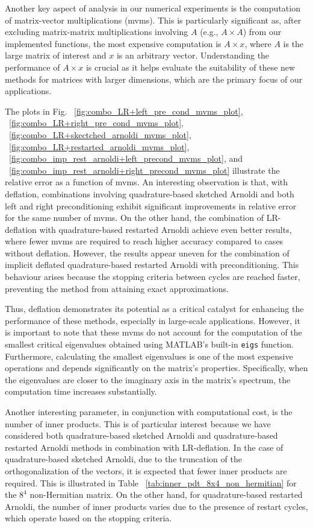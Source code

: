 Another key aspect of analysis in our numerical experiments is the computation of matrix-vector multiplications (mvms). This is particularly significant as, after excluding matrix-matrix multiplications involving $A$ (e.g., $A \times A$) from our implemented functions, the most expensive computation is $A \times x$, where $A$ is the large matrix of interest and $x$ is an arbitrary vector. Understanding the performance of $A \times x$ is crucial as it helps evaluate the suitability of these new methods for matrices with larger dimensions, which are the primary focus of our applications.

The plots in Fig. ~\ref{fig:combo_LR+left_pre_cond_mvms_plot},
~\ref{fig:combo_LR+right_pre_cond_mvms_plot}, ~\ref{fig:combo_LR+skectched_arnoldi_mvms_plot}, ~\ref{fig:combo_LR+restarted_arnoldi_mvms_plot},
~\ref{fig:combo_imp_rest_arnoldi+left_precond_mvms_plot}, and ~\ref{fig:combo_imp_rest_arnoldi+right_precond_mvms_plot}  illustrate the relative error as a function of mvms. An interesting observation is that, with deflation, combinations involving quadrature-based sketched Arnoldi and both left and right preconditioning exhibit significant improvements in relative error for the same number of mvms. On the other hand, the combination of LR-deflation with quadrature-based restarted Arnoldi achieve even better results, where fewer mvms are required to reach higher accuracy compared to cases without deflation. However, the results appear uneven for the combination of implicit deflated quadrature-based restarted Arnoldi with preconditioning. This behaviour arises because the stopping criteria between cycles are reached faster, preventing the method from attaining exact approximations.

Thus, deflation demonstrates its potential as a critical catalyst for enhancing the performance of these methods, especially in large-scale applications. However, it is important to note that these mvms do not account for the computation of the smallest critical eigenvalues obtained using MATLAB's built-in \texttt{eigs} function. Furthermore, calculating the smallest eigenvalues is one of the most expensive operations and depends significantly on the matrix's properties. Specifically, when the eigenvalues are closer to the imaginary axis in the matrix's spectrum, the computation time increases substantially.

Another interesting parameter, in conjunction with computational cost, is the number of inner products. This is of particular interest because we have considered both quadrature-based sketched Arnoldi and quadrature-based restarted Arnoldi methods in combination with LR-deflation. In the case of quadrature-based sketched Arnoldi, due to the truncation of the orthogonalization of the vectors, it is expected that fewer inner products are required. This is illustrated in Table ~\ref{tab:inner_pdt_8x4_non_hermitian} for the $8^4$ non-Hermitian matrix. On the other hand, for quadrature-based restarted Arnoldi, the number of inner products varies due to the presence of restart cycles, which operate based on the stopping criteria.

